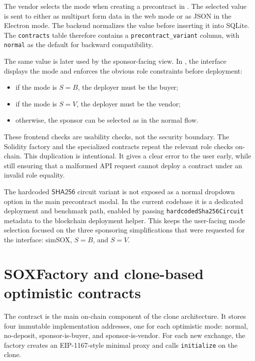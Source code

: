 The vendor selects the mode when creating a precontract in
. The selected value is sent to
 either as multipart form data in the web mode or as JSON in the
Electron mode. The backend normalizes the value before inserting it into SQLite. The
\texttt{contracts} table therefore contains a \texttt{precontract\_variant} column, with
\texttt{normal} as the default for backward compatibility.

The same value is later used by the sponsor-facing view. In
, the interface displays the
mode and enforces the obvious role constraints before deployment:

\begin{itemize}
  \item if the mode is \(S=B\), the deployer must be the buyer;
  \item if the mode is \(S=V\), the deployer must be the vendor;
  \item otherwise, the sponsor can be selected as in the normal flow.
\end{itemize}

These frontend checks are usability checks, not the security boundary. The Solidity factory
and the specialized contracts repeat the relevant role checks on-chain. This duplication is
intentional. It gives a clear error to the user early, while still ensuring that a malformed
API request cannot deploy a contract under an invalid role equality.

The hardcoded \(\mathsf{SHA256}\) circuit variant is not exposed as a normal dropdown option
in the main precontract modal. In the current codebase it is a dedicated deployment and
benchmark path, enabled by passing \texttt{hardcodedSha256Circuit} metadata to the blockchain
deployment helper. This keeps the user-facing mode selection focused on the three
sponsoring simplifications that were requested for the interface: simSOX, \(S=B\), and
\(S=V\).

\section[Factory and optimistic clones]{SOXFactory and clone-based optimistic contracts}

The contract  is the main on-chain component of
the clone architecture. It stores four immutable implementation addresses, one for each
optimistic mode: normal, no-deposit, sponsor-is-buyer, and sponsor-is-vendor. For each new
exchange, the factory creates an EIP-1167-style minimal proxy and calls
\texttt{initialize} on the clone.

